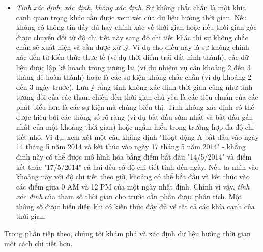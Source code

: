 \begin{itemize}
    \item \textit{Tính xác định}: \textit{xác định}, \textit{không xác định}. Sự không chắc chắn là một khía cạnh quan trọng khác cần được xem xét của dữ liệu hướng thời gian. Nếu không có thông tin đầy đủ hay chính xác về thời gian hoặc nếu thời gian gốc được chuyển đổi từ độ chi tiết này sang độ chi tiết khác thì sự không chắc chắn sẽ xuất hiện và cần được xử lý. Ví dụ cho điều này là sự không chính xác đến từ kiến thức thực tế (ví dụ thời điểm trái đất hình thành), các dữ liệu được lập kế hoạch trong tương lai (ví dụ nhiệm vụ cần khoảng 2 đến 3 tháng để hoàn thành) hoặc là các sự kiện không chắc chắn (ví dụ khoảng 2 đến 3 ngày trước). Lưu ý rằng tính không xác định thời gian cũng như tính tương đối của các tham chiếu đến thời gian chủ yếu là các tiêu chuẩn của các phát biểu hơn là các sự kiện mà chúng biểu thị. Tính không xác định có thể được hiểu bởi các thông số rõ ràng (ví dụ bắt đầu sớm nhất và bắt đầu gần nhất của một khoảng thời gian) hoặc ngầm hiểu trong trường hợp đa độ chi tiết nhỏ. Ví dụ, xem xét một câu khẳng định "Hoạt động A bắt đầu vào ngày 14 tháng 5 năm 2014 và kết thúc vào ngày 17 tháng 5 năm 2014" - khẳng định này có thể được mô hình hóa bằng điểm bắt đầu "14/5/2014" và điểm kết thúc "17/5/2014" cả hai đều có độ chi tiết tính đến ngày. Nếu ta nhìn vào khoảng này với độ chi tiết theo giờ, khoảng có thể bắt đầu và kết thúc vào các điểm giữa 0 AM và 12 PM của một ngày nhất định. Chính vì vậy, \textit{tính xác đinh} của tham số thời gian cho trước cần phần được phân tích. Một thông số được biểu diễn khi có kiến thức đầy đủ về  tất cả các khía cạnh của thời gian.
\end{itemize}
Trong phần tiếp theo, chúng tôi khám phá và xác định dữ liệu hướng thời gian một cách chi tiết hơn.